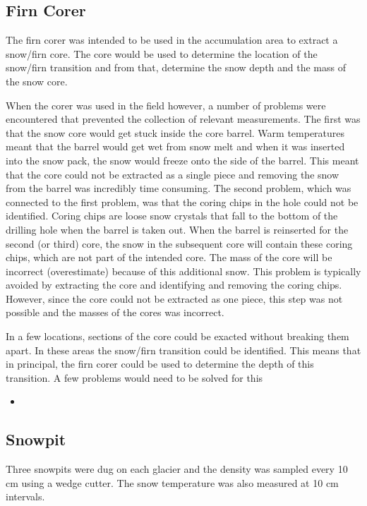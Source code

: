 \documentclass[12pt]{article}
\begin{document}
\subsection{Firn Corer}


The firn corer was intended to be used in the accumulation area to extract a snow/firn core. The core would be used to determine the location of the snow/firn transition and from that, determine the snow depth and the mass of the snow core. 

When the corer was used in the field however, a number of problems were encountered that prevented the collection of relevant measurements. The first was that the snow core would get stuck inside the core barrel. Warm temperatures meant that the barrel would get wet from snow melt and when it was inserted into the snow pack, the snow would freeze onto the side of the barrel. This meant that the core could not be extracted as a single piece and removing the snow from the barrel was incredibly time consuming. The second problem, which was connected to the first problem, was that the coring chips in the hole could not be identified. Coring chips are loose snow crystals that fall to the bottom of the drilling hole when the barrel is taken out. When the barrel is reinserted for the second (or third) core, the snow in the subsequent core will contain these coring chips, which are not part of the intended core. The mass of the core will be incorrect (overestimate) because of this additional snow. This problem is typically avoided by extracting the core and identifying and removing the coring chips. However, since the core could not be extracted as one piece, this step was not possible and the masses of the cores was incorrect. 

In a few locations, sections of the core could be exacted without breaking them apart. In these areas the snow/firn transition could be identified. This means that in principal, the firn corer could be used to determine the depth of this transition. A few problems would need to be solved for this 
\begin{itemize}[noitemsep]
\item 
\end{itemize}


\subsection{Snowpit}
\label{sec:snowpit}

Three snowpits were dug on each glacier and the density was sampled every 10 cm using a wedge cutter. The snow temperature was also measured at 10 cm intervals. 
\end{document}
